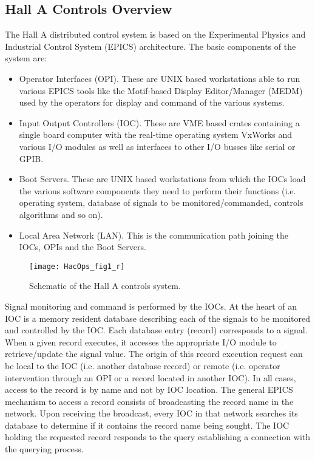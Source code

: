 \subsection{Hall A Controls Overview}
The Hall A distributed control system is based on the 
Experimental Physics and Industrial Control System 
(EPICS)\cite{EPICSwww}%
 architecture.
The basic components of the system are:
\begin{itemize}
\item Operator Interfaces (OPI). These are UNIX based workstations able to run various
EPICS tools like the Motif-based Display Editor/Manager (MEDM) used by the operators
for display and command of the various systems.
\item Input Output Controllers (IOC). These are VME based crates containing a single
board computer with the real-time operating system VxWorks and various I/O modules as well
as interfaces to other I/O busses like serial or GPIB.
\item Boot Servers. These are UNIX based workstations from which the IOCs load the various
software components they need to perform their functions (i.e. operating system, database
of signals to be monitored/commanded, controls algorithms and so on).
\item Local Area Network (LAN). This is the communication path joining the IOCs, OPIs and
the Boot Servers.
\end{itemize}

\begin{figure}[htb]
\begin{center}
\texttt{[image: HacOps\_fig1\_r]}
{\linespread{1.}
\caption[Controls: Schematic]{Schematic of the Hall A controls
system.}
\label{fig:halla_controls}}
\end{center}
\end{figure}

Signal monitoring and command is performed by the IOCs. At the
heart of an IOC is a memory resident
database describing each of the signals to be monitored and controlled by the IOC.
Each database entry (record) corresponds to a signal. When a given record executes, it
accesses the appropriate I/O module to retrieve/update the signal value. The origin of this
record execution request can be local to the IOC
(i.e. another database record) or remote (i.e. operator intervention through an OPI or a
record located in another IOC).
In all cases, access to the record is by name and not by IOC location.
The general EPICS mechanism to access a record consists of
broadcasting the record name in the network.
Upon receiving the broadcast, every IOC in that network searches its database
to determine if it contains the record name being sought. The IOC holding the requested record
responds to the query establishing a connection with the querying process.

